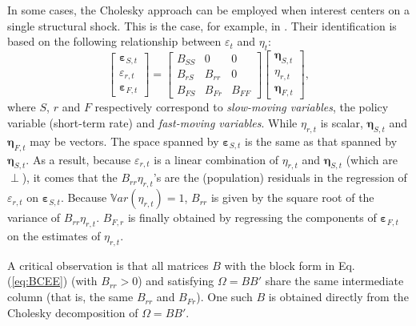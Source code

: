 \documentclass[
  11pt,
]{book}
\theoremstyle{definition}
\theoremstyle{definition}
\theoremstyle{definition}
\theoremstyle{definition}
\theoremstyle{remark}
\begin{document}
In some cases, the Cholesky approach can be employed when interest centers on a single structural shock. This is the case, for example, in \citet{Christiano_Eichenbaum_Evans_1996}. Their identification is based on the following relationship between \(\varepsilon_t\) and \(\eta_t\):
\begin{equation}
\left[\begin{array}{c}
\boldsymbol\varepsilon_{S,t}\\
\varepsilon_{r,t}\\
\boldsymbol\varepsilon_{F,t}
\end{array}\right] =
\left[\begin{array}{ccc}
B_{SS} & 0 & 0 \\
B_{rS} & B_{rr} & 0 \\
B_{FS} & B_{Fr} & B_{FF}
\end{array}\right]
\left[\begin{array}{c}
\boldsymbol\eta_{S,t}\\
\eta_{r,t}\\
\boldsymbol\eta_{F,t}
\end{array}\right],\label{eq:BCEE}
\end{equation}
where \(S\), \(r\) and \(F\) respectively correspond to \emph{slow-moving variables}, the policy variable (short-term rate) and \emph{fast-moving variables}. While \(\eta_{r,t}\) is scalar, \(\boldsymbol\eta_{S,t}\) and \(\boldsymbol\eta_{F,t}\) may be vectors. The space spanned by \(\boldsymbol\varepsilon_{S,t}\) is the same as that spanned by \(\boldsymbol\eta_{S,t}\). As a result, because \(\varepsilon_{r,t}\) is a linear combination of \(\eta_{r,t}\) and \(\boldsymbol\eta_{S,t}\) (which are \(\perp\)), it comes that the \(B_{rr}\eta_{r,t}\)'s are the (population) residuals in the regression of \(\varepsilon_{r,t}\) on \(\boldsymbol\varepsilon_{S,t}\). Because \(\mathbb{V}ar(\eta_{r,t})=1\), \(B_{rr}\) is given by the square root of the variance of \(B_{rr}\eta_{r,t}\). \(B_{F,r}\) is finally obtained by regressing the components of \(\boldsymbol\varepsilon_{F,t}\) on the estimates of \(\eta_{r,t}\).

A critical observation is that all matrices \(B\) with the block form in Eq. (\eqref{eq:BCEE}) (with \(B_{rr}>0\)) and satisfying \(\Omega=BB'\) share the same intermediate column (that is, the same \(B_{rr}\) and \(B_{Fr}\)). One such \(B\) is obtained directly from the Cholesky decomposition of \(\Omega=BB'\).
\end{document}
